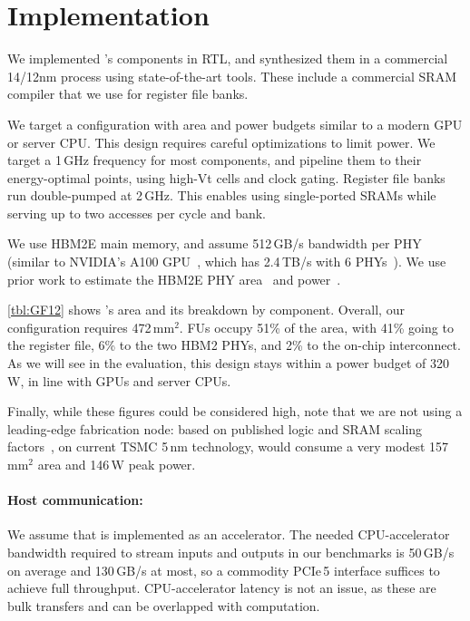\section{Implementation}\label{sec:implementation}

We implemented \name's components in RTL,
and synthesized them in a commercial 14/12nm process using state-of-the-art tools.
These include a commercial SRAM compiler that we use for register file banks.

We target a configuration with area and power budgets similar to a modern GPU or server CPU.
This design requires careful optimizations to limit power.
We target a 1\,GHz frequency for most components, and pipeline them to their 
energy-optimal points, using high-Vt cells and clock gating.
Register file banks run double-pumped at 2\,GHz.
This enables using single-ported SRAMs while serving up to two accesses per cycle and bank.

\tblGF
We use HBM2E main memory, and assume 512\,GB/s bandwidth per PHY
(similar to NVIDIA's A100 GPU~\cite{choquette2021nvidia}, which has 2.4\,TB/s 
with 6 PHYs~\cite{nvidiadgx}).
We use prior work to estimate the HBM2E PHY area~\cite{rambuswhite,dasgupta20208} 
and power~\cite{rambuswhite,ge2011design}.

\autoref{tbl:GF12} shows \name's area and its breakdown by component.
Overall, our \name configuration requires 472\,mm$^2$. %
FUs occupy 51\% of the area, with 41\% going to the register file,
6\% to the two HBM2 PHYs,
and 2\% to the on-chip interconnect.
As we will see in the evaluation, this design stays within a power budget of 320\,W,
in line with GPUs and server CPUs.


Finally, while these figures could be considered high,
note that we are not using a leading-edge fabrication node:
based on published logic and SRAM scaling factors~\cite{yeap:iedm19:tsmc-n5},
on current TSMC 5\,nm technology,
\name would consume a very modest
157\,mm$^\textrm{2}$ area and 146\,W peak power.

\paragraph{Host communication:}
We assume that \name is implemented as an accelerator.
The needed CPU-accelerator bandwidth required to stream inputs and outputs
in our benchmarks is 50\,GB/s on average and 130\,GB/s at most,
so a commodity PCIe\,5 interface suffices to achieve full throughput.
CPU-accelerator latency is not an issue, as these are bulk transfers
and can be overlapped with computation.

